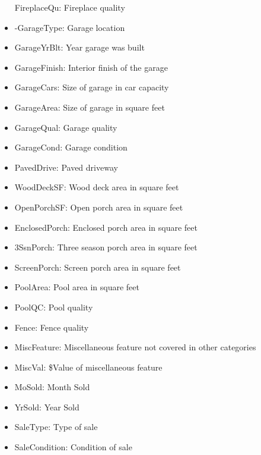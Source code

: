 \documentclass[11pt, a4paper , landscape]{article}
\begin{document}
\begin{itemize}
  FireplaceQu: Fireplace quality
\item
  -GarageType: Garage location
\item
  GarageYrBlt: Year garage was built
\item
  GarageFinish: Interior finish of the garage
\item
  GarageCars: Size of garage in car capacity
\item
  GarageArea: Size of garage in square feet
\item
  GarageQual: Garage quality
\item
  GarageCond: Garage condition
\item
  PavedDrive: Paved driveway
\item
  WoodDeckSF: Wood deck area in square feet
\item
  OpenPorchSF: Open porch area in square feet
\item
  EnclosedPorch: Enclosed porch area in square feet
\item
  3SsnPorch: Three season porch area in square feet
\item
  ScreenPorch: Screen porch area in square feet
\item
  PoolArea: Pool area in square feet
\item
  PoolQC: Pool quality
\item
  Fence: Fence quality
\item
  MiscFeature: Miscellaneous feature not covered in other categories
\item
  MiscVal: \$Value of miscellaneous feature
\item
  MoSold: Month Sold
\item
  YrSold: Year Sold
\item
  SaleType: Type of sale
\item
  SaleCondition: Condition of sale
\end{itemize}
\end{document}
